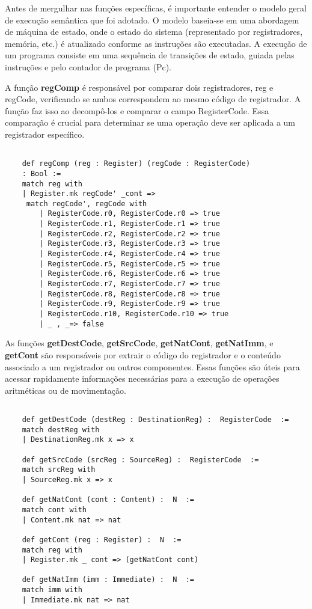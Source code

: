 \documentclass[sigconf]{acmart}
\begin{document}
Antes de mergulhar nas funções específicas, é importante entender o modelo geral de execução semântica que foi adotado. O modelo baseia-se em uma abordagem de máquina de estado, onde o estado do sistema (representado por registradores, memória, etc.) é atualizado conforme as instruções são executadas. A execução de um programa consiste em uma sequência de transições de estado, guiada pelas instruções e pelo contador de programa (Pc).

A função \textbf{regComp} é responsável por comparar dois registradores, reg e regCode, verificando se ambos correspondem ao mesmo código de registrador. A função faz isso ao decompô-los e comparar o campo RegisterCode. Essa comparação é crucial para determinar se uma operação deve ser aplicada a um registrador específico.

\begin{center}
\begin{verbatim}
    
    def regComp (reg : Register) (regCode : RegisterCode)
    : Bool :=
    match reg with
    | Register.mk regCode' _cont =>
     match regCode', regCode with
        | RegisterCode.r0, RegisterCode.r0 => true
        | RegisterCode.r1, RegisterCode.r1 => true
        | RegisterCode.r2, RegisterCode.r2 => true
        | RegisterCode.r3, RegisterCode.r3 => true
        | RegisterCode.r4, RegisterCode.r4 => true
        | RegisterCode.r5, RegisterCode.r5 => true
        | RegisterCode.r6, RegisterCode.r6 => true
        | RegisterCode.r7, RegisterCode.r7 => true
        | RegisterCode.r8, RegisterCode.r8 => true
        | RegisterCode.r9, RegisterCode.r9 => true
        | RegisterCode.r10, RegisterCode.r10 => true
        | _ , _=> false

\end{verbatim}
\end{center}

As funções \textbf{getDestCode}, \textbf{getSrcCode}, \textbf{getNatCont}, \textbf{getNatImm}, e \textbf{getCont} são responsáveis por extrair o código do registrador e o conteúdo associado a um registrador ou outros componentes. Essas funções são úteis para acessar rapidamente informações necessárias para a execução de operações aritméticas ou de movimentação.

\begin{center}
\begin{verbatim}
        
    def getDestCode (destReg : DestinationReg) :  RegisterCode  :=
    match destReg with
    | DestinationReg.mk x => x

    def getSrcCode (srcReg : SourceReg) :  RegisterCode  :=
    match srcReg with
    | SourceReg.mk x => x
    
    def getNatCont (cont : Content) :  N  :=
    match cont with
    | Content.mk nat => nat

    def getCont (reg : Register) :  N  :=
    match reg with
    | Register.mk _ cont => (getNatCont cont)

    def getNatImm (imm : Immediate) :  N  :=
    match imm with
    | Immediate.mk nat => nat
    
\end{verbatim}
\end{center}
\end{document}
